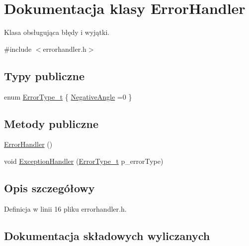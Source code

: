 \hypertarget{class_error_handler}{}\section{Dokumentacja klasy Error\+Handler}
\label{class_error_handler}


Klasa obsługująca błędy i wyjątki.  




{\ttfamily \#include $<$errorhandler.\+h$>$}

\subsection*{Typy publiczne}
\begin{DoxyCompactItemize}
\item 
enum \hyperlink{class_error_handler_aee61709d471d61ec7d1069369565b59a}{Error\+Type\+\_\+t} \{ \hyperlink{class_error_handler_aee61709d471d61ec7d1069369565b59aa1ecd3180072ace794160f0cfcfea9458}{Negative\+Angle} =0
 \}
\end{DoxyCompactItemize}
\subsection*{Metody publiczne}
\begin{DoxyCompactItemize}
\item 
\hyperlink{class_error_handler_a7e5f379bd231442b898cef94556b2107}{Error\+Handler} ()
\item 
void \hyperlink{class_error_handler_a418fa4905c14ec2682fffc2c956afa4a}{Exception\+Handler} (\hyperlink{class_error_handler_aee61709d471d61ec7d1069369565b59a}{Error\+Type\+\_\+t} p\+\_\+error\+Type)
\end{DoxyCompactItemize}


\subsection{Opis szczegółowy}


Definicja w linii 16 pliku errorhandler.\+h.



\subsection{Dokumentacja składowych wyliczanych}
\mbox{\label{class_error_handler_aee61709d471d61ec7d1069369565b59a}} 
